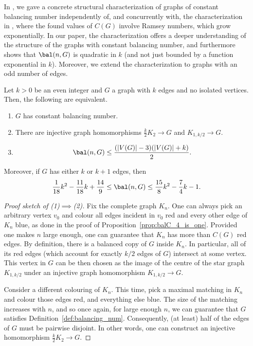 In \cite{Caroetal2023}, we gave a concrete structural characterization of graphs of constant balancing number independently of, and concurrently with, the characterization in \cite[Section~3.2]{caro2022evolution}, where the found values of $C(G)$ involve Ramsey numbers, which grow exponentially.
In our paper, the characterization offers a deeper understanding of the structure of the graphs with constant balancing number, and furthermore shows that $\bal(n,G)$ is quadratic in $k$ (and not just bounded by a function exponential in $k$).
Moreover, we extend the characterization to graphs with an odd number of edges.

\begin{theorem}\label{thm:constant_bal}
    Let $k>0$ be an even integer and $G$ a graph with $k$ edges and no isolated vertices.
    Then, the following are equivalent.
    \begin{enumerate}
        \item $G$ has constant balancing number.

        \item There are injective graph homomorphisms $\frac k2K_2\to G$ and $K_{1,k/2}\to G$.
        
        \item $$\bal(n,G)\leq\frac{(|V(G)|-3)(|V(G)|+k)}2.$$ 
    \end{enumerate}

    Moreover, if $G$ has either $k$ or $k+1$ edges, then $$\frac1{18}k^2-\frac{11}{18}k+\frac{14}9\leq\bal(n,G)\leq\frac{15}8k^2-\frac74k-1.$$
\end{theorem}

\begin{proof}[Proof sketch of (1)$\implies$(2)]
    Fix the complete graph $K_n$.
    One can always pick an arbitrary vertex $v_0$ and colour all edges incident in $v_0$ red and every other edge of $K_n$ blue, as done in the proof of Proposition~\ref{prop:balC_4_is_one}.
    Provided one makes $n$ large enough, one can guarantee that $K_n$ has more than $C(G)$ red edges.
    By definition, there is a balanced copy of $G$ inside $K_n$.
    In particular, all of its red edges (which account for exactly $k/2$ edges of $G$) intersect at some vertex.
    This vertex in $G$ can be then chosen as the image of the centre of the star graph $K_{1,k/2}$ under an injective graph homomorphism $K_{1,k/2}\to G$.

    Consider a different colouring of $K_n$.
    This time, pick a maximal matching in $K_n$ and colour those edges red, and everything else blue.
    The size of the matching increases with $n$, and so once again, for large enough $n$, we can guarantee that $G$ satisfies Definition~\ref{def:balancing_num}.
    Consequently, (at least) half of the edges of $G$ must be pairwise disjoint.
    In other words, one can construct an injective homomorphism $\frac k2K_2\to G$.
\end{proof}

